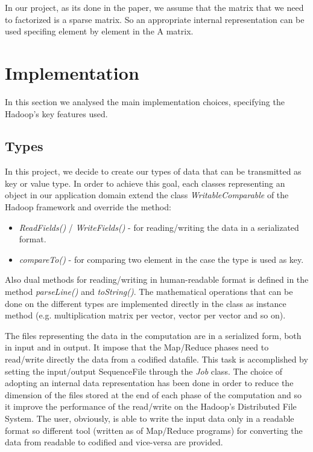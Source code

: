 \documentclass[a4paper,12pt]{article}
\newcommand{\METHOD}[1] {\textit{#1}}
\newcommand{\CLASS}[1] {\textit{#1}}
\begin{document}
In our project, as its done in the paper, we assume that the matrix that we need to factorized is a sparse matrix. So an appropriate internal representation can be used specifing element by element in the A matrix.

\section{Implementation}
\label{implementation}

In this section we analysed the main implementation choices, specifying the Hadoop's key features used.


\subsection{Types}
In this project, we decide to create our types of data that can be transmitted as key or value type. In order to achieve this goal, each classes representing an object in our application domain extend the class \CLASS{WritableComparable} of the Hadoop framework and override the method:
\begin{itemize}
  \item \METHOD{ReadFields()} / \METHOD{WriteFields()} - for reading/writing the data in a serializated format.
  \item \METHOD{compareTo()} - for comparing two element in the case the type is used as key.
\end{itemize}

Also dual methods for reading/writing in human-readable format is defined in the method \METHOD{parseLine()} and \METHOD{toString()}. The mathematical operations that can be done on the different types are implemented directly in the class as instance method (e.g. multiplication matrix per vector, vector per vector and so on). 

The files representing the data in the computation are in a serialized form, both in input and in output. It impose that the Map/Reduce phases need to read/write directly the data from a codified datafile. This task is accomplished by setting the input/output SequenceFile through the \CLASS{Job} class. The choice of adopting an internal data representation has been done in order to reduce the dimension of the files stored at the end of each phase of the computation and so it improve the performance of the read/write on the Hadoop's Distributed File System. The user, obviously, is able to write the input data only in a readable format so different tool (written as of Map/Reduce programs) for converting the data from readable to codified and vice-versa are provided.
\end{document}
